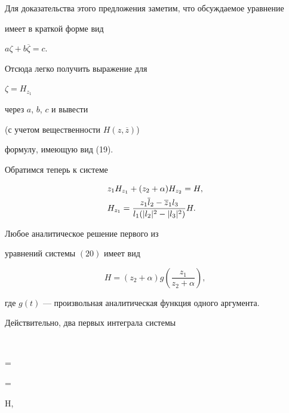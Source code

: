 Для доказательства этого предложения заметим, что обсуждаемое уравнение 


имеет в краткой форме вид


$ a \zeta + b \overline {\zeta} = c. $


 Отсюда легко получить выражение для 


$ \zeta = H_{z_1} $ 


через $a$, $b$, $c$ и вывести 


(с учетом вещественности $ H(z,\overline z) $) 


формулу, имеющую вид (19). 








Обратимся теперь к системе 


\begin{align}


&z_1 H_{z_1} + ( z_2 + \alpha )  H_{z_2} = H,\\


& H_{z_1} =


\frac { z_1 \overline l_2 - \overline z_1 l_3 }


{ l_1 ( |l_2|^2 - |l_3|^2 ) } H.\notag


\end{align}





\begin{prop}


Любое аналитическое решение первого из 


уравнений системы $(20)$ имеет вид 


\begin{equation}


 H = ( z_2 + \alpha ) g \left(\frac {z_1}{ z_2 + \alpha} \right),


\end{equation}


где $ g(t) $ --- произвольная аналитическая функция одного аргумента.


\end{prop}





Действительно, два первых интеграла системы 


$$


  = 


  = 


 H,


